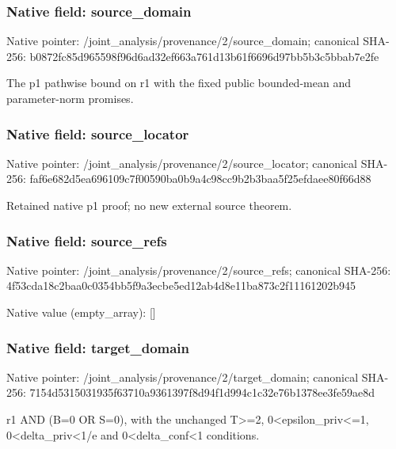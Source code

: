 \documentclass[10pt,a4paper]{article}
\begin{document}
\subsubsection{Native field: source\_\allowbreak{}domain}
Native pointer: /joint\_\allowbreak{}analysis/provenance/2/source\_\allowbreak{}domain; canonical SHA-256: b0872fc85d965598f96d6ad32ef663a761d13b61f6696d97bb5b3c5bbab7e2fe

\begingroup\raggedright\sloppy The p1 pathwise bound on r1 with the fixed public bounded-mean and parameter-norm promises.\par\endgroup

\subsubsection{Native field: source\_\allowbreak{}locator}
Native pointer: /joint\_\allowbreak{}analysis/provenance/2/source\_\allowbreak{}locator; canonical SHA-256: faf6e682d5ea696109c7f00590ba0b9a4c98cc9b2b3baa5f25efdaee80f66d88

\begingroup\raggedright\sloppy Retained native p1 proof;\allowbreak{} no new external source theorem.\par\endgroup

\subsubsection{Native field: source\_\allowbreak{}refs}
Native pointer: /joint\_\allowbreak{}analysis/provenance/2/source\_\allowbreak{}refs; canonical SHA-256: 4f53cda18c2baa0c0354bb5f9a3ecbe5ed12ab4d8e11ba873c2f11161202b945

Native value (empty\_\allowbreak{}array): []

\subsubsection{Native field: target\_\allowbreak{}domain}
Native pointer: /joint\_\allowbreak{}analysis/provenance/2/target\_\allowbreak{}domain; canonical SHA-256: 7154d5315031935f63710a9361397f8d94f1d994c1c32e76b1378ee3fe59ae8d

\begingroup\raggedright\sloppy r1 AND (B=\allowbreak{}0 OR S=\allowbreak{}0),\allowbreak{} with the unchanged T>=\allowbreak{}2,\allowbreak{} 0<epsilon\_\allowbreak{}priv<=\allowbreak{}1,\allowbreak{} 0<delta\_\allowbreak{}priv<1/\allowbreak{}e and 0<delta\_\allowbreak{}conf<1 conditions.\par\endgroup
\end{document}

